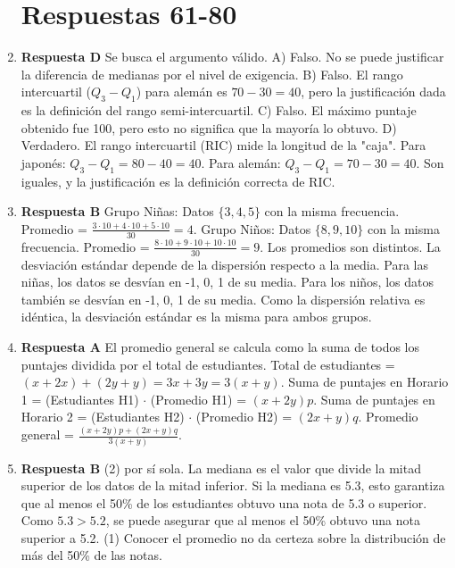 \documentclass[11pt]{article}
\begin{document}
\begin{enumerate}
    
    \section{Respuestas 61-80}

    \item \textbf{Respuesta D} Se busca el argumento válido. A) Falso. No se puede justificar la diferencia de medianas por el nivel de exigencia. B) Falso. El rango intercuartil ($Q_3-Q_1$) para alemán es $70-30=40$, pero la justificación dada es la definición del rango semi-intercuartil. C) Falso. El máximo puntaje obtenido fue 100, pero esto no significa que la mayoría lo obtuvo. D) Verdadero. El rango intercuartil (RIC) mide la longitud de la "caja". Para japonés: $Q_3-Q_1=80-40=40$. Para alemán: $Q_3-Q_1=70-30=40$. Son iguales, y la justificación es la definición correcta de RIC. %

    \item \textbf{Respuesta B} Grupo Niñas: Datos $\{3,4,5\}$ con la misma frecuencia. Promedio = $\frac{3\cdot10+4\cdot10+5\cdot10}{30}=4$. Grupo Niños: Datos $\{8,9,10\}$ con la misma frecuencia. Promedio = $\frac{8\cdot10+9\cdot10+10\cdot10}{30}=9$. Los promedios son distintos. La desviación estándar depende de la dispersión respecto a la media. Para las niñas, los datos se desvían en -1, 0, 1 de su media. Para los niños, los datos también se desvían en -1, 0, 1 de su media. Como la dispersión relativa es idéntica, la desviación estándar es la misma para ambos grupos. %
    
    \item \textbf{Respuesta A} El promedio general se calcula como la suma de todos los puntajes dividida por el total de estudiantes. Total de estudiantes = $(x+2x)+(2y+y)=3x+3y=3(x+y)$. Suma de puntajes en Horario 1 = (Estudiantes H1) $\cdot$ (Promedio H1) = $(x+2y)p$. Suma de puntajes en Horario 2 = (Estudiantes H2) $\cdot$ (Promedio H2) = $(2x+y)q$. Promedio general = $\frac{(x+2y)p+(2x+y)q}{3(x+y)}$. %
    
    \item \textbf{Respuesta B} (2) por sí sola. La mediana es el valor que divide la mitad superior de los datos de la mitad inferior. Si la mediana es 5.3, esto garantiza que al menos el 50\% de los estudiantes obtuvo una nota de 5.3 o superior. Como $5.3 > 5.2$, se puede asegurar que al menos el 50\% obtuvo una nota superior a 5.2. (1) Conocer el promedio no da certeza sobre la distribución de más del 50\% de las notas. %
    

\end{enumerate}
\end{document}
